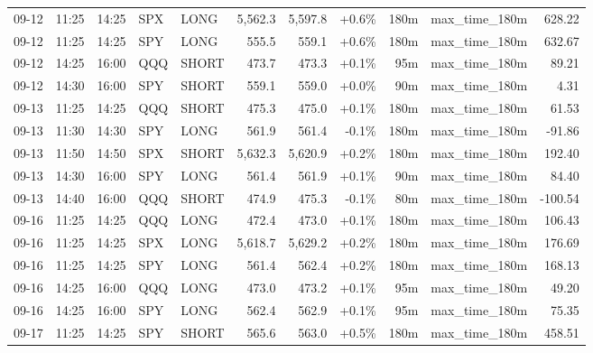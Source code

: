 \documentclass[11pt,a4paper,twoside]{article}
\begin{document}
\begin{center}
\begin{longtable}{>{\color{txtmain}}l l l l l r r r r >{\color{txtmain}}l r}
09-12 & 11:25 & 14:25 & SPX & LONG & 5,562.3 & 5,597.8 & \textcolor{wingreen}{+0.6\%} & 180m & max\_time\_180m & \textcolor{wingreen}{628.22} \\
09-12 & 11:25 & 14:25 & SPY & LONG & 555.5 & 559.1 & \textcolor{wingreen}{+0.6\%} & 180m & max\_time\_180m & \textcolor{wingreen}{632.67} \\
09-12 & 14:25 & 16:00 & QQQ & SHORT & 473.7 & 473.3 & \textcolor{wingreen}{+0.1\%} & 95m & max\_time\_180m & \textcolor{wingreen}{89.21} \\
09-12 & 14:30 & 16:00 & SPY & SHORT & 559.1 & 559.0 & \textcolor{wingreen}{+0.0\%} & 90m & max\_time\_180m & \textcolor{wingreen}{4.31} \\
09-13 & 11:25 & 14:25 & QQQ & SHORT & 475.3 & 475.0 & \textcolor{wingreen}{+0.1\%} & 180m & max\_time\_180m & \textcolor{wingreen}{61.53} \\
09-13 & 11:30 & 14:30 & SPY & LONG & 561.9 & 561.4 & \textcolor{lossred}{-0.1\%} & 180m & max\_time\_180m & \textcolor{lossred}{-91.86} \\
09-13 & 11:50 & 14:50 & SPX & SHORT & 5,632.3 & 5,620.9 & \textcolor{wingreen}{+0.2\%} & 180m & max\_time\_180m & \textcolor{wingreen}{192.40} \\
09-13 & 14:30 & 16:00 & SPY & LONG & 561.4 & 561.9 & \textcolor{wingreen}{+0.1\%} & 90m & max\_time\_180m & \textcolor{wingreen}{84.40} \\
09-13 & 14:40 & 16:00 & QQQ & SHORT & 474.9 & 475.3 & \textcolor{lossred}{-0.1\%} & 80m & max\_time\_180m & \textcolor{lossred}{-100.54} \\
09-16 & 11:25 & 14:25 & QQQ & LONG & 472.4 & 473.0 & \textcolor{wingreen}{+0.1\%} & 180m & max\_time\_180m & \textcolor{wingreen}{106.43} \\
09-16 & 11:25 & 14:25 & SPX & LONG & 5,618.7 & 5,629.2 & \textcolor{wingreen}{+0.2\%} & 180m & max\_time\_180m & \textcolor{wingreen}{176.69} \\
09-16 & 11:25 & 14:25 & SPY & LONG & 561.4 & 562.4 & \textcolor{wingreen}{+0.2\%} & 180m & max\_time\_180m & \textcolor{wingreen}{168.13} \\
09-16 & 14:25 & 16:00 & QQQ & LONG & 473.0 & 473.2 & \textcolor{wingreen}{+0.1\%} & 95m & max\_time\_180m & \textcolor{wingreen}{49.20} \\
09-16 & 14:25 & 16:00 & SPY & LONG & 562.4 & 562.9 & \textcolor{wingreen}{+0.1\%} & 95m & max\_time\_180m & \textcolor{wingreen}{75.35} \\
09-17 & 11:25 & 14:25 & SPY & SHORT & 565.6 & 563.0 & \textcolor{wingreen}{+0.5\%} & 180m & max\_time\_180m & \textcolor{wingreen}{458.51} \\

\end{longtable}
\end{center}
\end{document}
